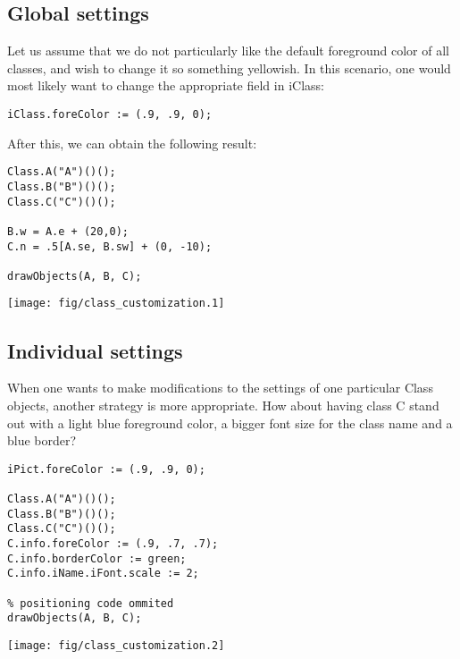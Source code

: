 \documentclass{article}
\newcommand{\code}{\ttfamily}
\begin{document}
\subsection{Global settings}

Let us assume that we do not particularly like the default foreground color of all classes, and wish
to change it so something yellowish. In this scenario, one would most likely want to change
the appropriate field in {\code iClass}:

\begin{verbatim}
iClass.foreColor := (.9, .9, 0);
\end{verbatim}

After this, we can obtain the following result:

\begin{multicols}{2}
\begin{verbatim}
Class.A("A")()();
Class.B("B")()();
Class.C("C")()();

B.w = A.e + (20,0);
C.n = .5[A.se, B.sw] + (0, -10);

drawObjects(A, B, C);
\end{verbatim}
\columnbreak
\hspace{1cm}\texttt{[image: fig/class\_customization.1]}
\end{multicols}

\subsection{Individual settings}

When one wants to make modifications to the settings of one particular
{\code Class} objects, another strategy is more appropriate. How about having class
{\code C} stand out with a light blue foreground color, a bigger font size for the class name and a blue border?

\pagebreak
\begin{multicols}{2}
\begin{verbatim}
iPict.foreColor := (.9, .9, 0);

Class.A("A")()();
Class.B("B")()();
Class.C("C")()();
C.info.foreColor := (.9, .7, .7);
C.info.borderColor := green;
C.info.iName.iFont.scale := 2;

% positioning code ommited
drawObjects(A, B, C);
\end{verbatim}
\columnbreak
\hspace{1cm}\texttt{[image: fig/class\_customization.2]}
\end{multicols}
\end{document}
